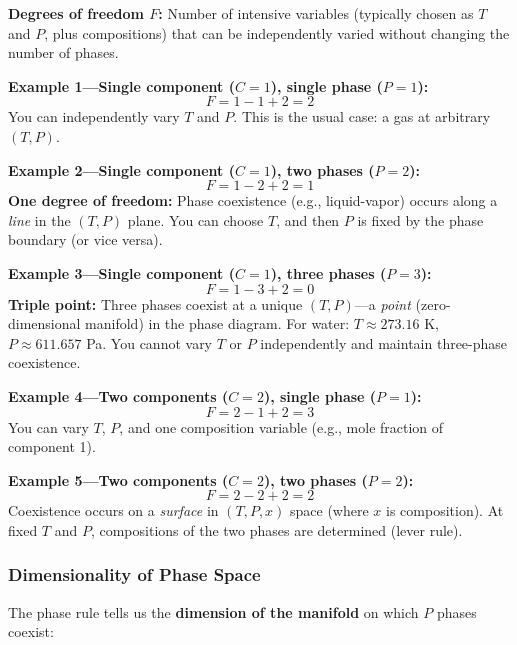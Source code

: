 \documentclass[9pt,twocoloumn]{article}
\begin{document}
\textbf{Degrees of freedom $F$:} Number of intensive variables (typically chosen as $T$ and $P$, plus compositions) that can be independently varied without changing the number of phases.

\textbf{Example 1—Single component ($C=1$), single phase ($P=1$):}
\begin{equation}
F = 1 - 1 + 2 = 2
\end{equation}
You can independently vary $T$ and $P$. This is the usual case: a gas at arbitrary $(T, P)$.

\textbf{Example 2—Single component ($C=1$), two phases ($P=2$):}
\begin{equation}
F = 1 - 2 + 2 = 1
\end{equation}
\textbf{One degree of freedom:} Phase coexistence (e.g., liquid-vapor) occurs along a \emph{line} in the $(T, P)$ plane. You can choose $T$, and then $P$ is fixed by the phase boundary (or vice versa).

\textbf{Example 3—Single component ($C=1$), three phases ($P=3$):}
\begin{equation}
F = 1 - 3 + 2 = 0
\end{equation}
\textbf{Triple point:} Three phases coexist at a unique $(T, P)$—a \emph{point} (zero-dimensional manifold) in the phase diagram. For water: $T \approx 273.16$ K, $P \approx 611.657$ Pa. You cannot vary $T$ or $P$ independently and maintain three-phase coexistence.

\textbf{Example 4—Two components ($C=2$), single phase ($P=1$):}
\begin{equation}
F = 2 - 1 + 2 = 3
\end{equation}
You can vary $T$, $P$, and one composition variable (e.g., mole fraction of component 1).

\textbf{Example 5—Two components ($C=2$), two phases ($P=2$):}
\begin{equation}
F = 2 - 2 + 2 = 2
\end{equation}
Coexistence occurs on a \emph{surface} in $(T, P, x)$ space (where $x$ is composition). At fixed $T$ and $P$, compositions of the two phases are determined (lever rule).

\subsubsection{Dimensionality of Phase Space}

The phase rule tells us the \textbf{dimension of the manifold} on which $P$ phases coexist:
\end{document}
